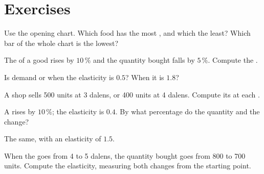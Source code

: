 \section{Exercises}

\begin{exercise}[$\star$]\label{exo:g9:elasticity-first-look:1}
Use the opening chart. Which food has the most , and which the least? Which bar of the
whole chart is the lowest?
\end{exercise}

\begin{exercise}[$\star$]\label{exo:g9:elasticity-first-look:2}
The  of a good rises by $10\,\%$ and the quantity bought falls by $5\,\%$. Compute the .
\end{exercise}

\begin{exercise}[$\star$]\label{exo:g9:elasticity-first-look:3}
Is demand  or  when the elasticity is $0.5$? When it is $1.8$?
\end{exercise}

\begin{exercise}[$\star$]\label{exo:g9:elasticity-first-look:4}
A shop sells 500 units at 3 dalens, or 400 units at 4 dalens. Compute its  at each .
\end{exercise}

\begin{exercise}[$\star\star$]\label{exo:g9:elasticity-first-look:5}
A  rises by $10\,\%$; the elasticity is $0.4$. By what percentage do the quantity and the 
change?
\end{exercise}

\begin{exercise}[$\star\star$]\label{exo:g9:elasticity-first-look:6}
The same, with an elasticity of $1.5$.
\end{exercise}

\begin{exercise}[$\star\star$]\label{exo:g9:elasticity-first-look:7}
When the  goes from 4 to 5 dalens, the quantity bought goes from 800 to 700 units. Compute the
elasticity, measuring both changes from the starting point.
\end{exercise}

